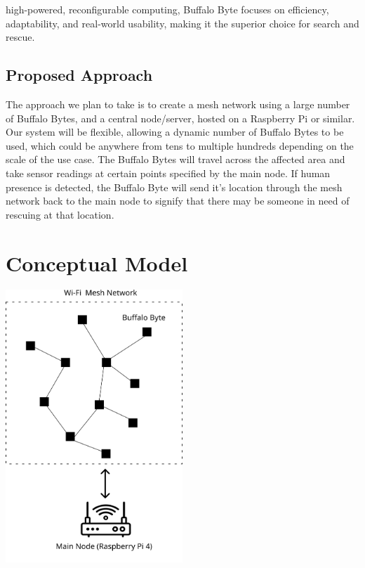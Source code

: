 \documentclass[10pt]{article}
\begin{document}
high-powered, reconfigurable computing, Buffalo Byte focuses on efficiency, adaptability, and real-world usability, making it the superior choice for search and rescue.
\subsection*{Proposed Approach}
The approach we plan to take is to create a mesh network using a large number of Buffalo Bytes, and a central node/server, hosted on a Raspberry Pi or similar. Our system will be flexible, allowing a dynamic number of Buffalo Bytes to be used, which could be anywhere from tens to multiple hundreds depending on the scale of the use case. The Buffalo Bytes will travel across the affected area and take sensor readings at certain points specified by the main node. If human presence is detected, the Buffalo Byte will send it's location through the mesh network back to the main node to signify that there may be someone in need of rescuing at that location.

\section*{Conceptual Model}
\begin{center}
\includegraphics[width=0.5\textwidth]{conceptual-model}\\
\end{center}
\end{document}
